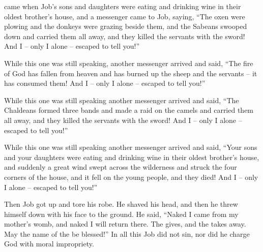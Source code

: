{came when Job’s sons
and daughters
were eating
and drinking
wine
in their oldest
brother’s
house,
and a messenger
came
to
Job,
saying,
“The oxen
were plowing
and the donkeys
were grazing
beside
them,
and the Sabeans
swooped down
and carried
them all away,
and they killed
the servants
with the sword! And I – only I alone – escaped to tell you!”
\par }{\PP {}While
this
one was still speaking,
another
messenger arrived
and said,
“The fire
of God
has fallen
from
heaven
and has burned
up the sheep
and the servants
– it has consumed them! And I – only I alone – escaped to tell you!”
\par }{\PP {}While
this
one was still speaking
another
messenger arrived
and said,
“The Chaldeans
formed three
bands
and made a raid
on
the camels
and carried
them all away,
and they killed
the servants
with the sword! And I – only I alone – escaped to tell you!”
\par }{\PP {}While
this
one was still speaking
another
messenger arrived
and said,
“Your sons
and your daughters
were eating
and drinking
wine
in their oldest
brother’s
house,
and suddenly
a great
wind
swept
across
the wilderness
and struck
the four
corners
of the house,
and it fell
on
the young people,
and they died! And I – only I alone – escaped to tell you!”
\par }{\PP {}Then Job
got
up and tore
his robe.
He shaved
his head,
and then he threw
himself down with his face
to the ground.
He said,
“Naked
I came
from my mother’s
womb,
and naked
I will return
there.
The
{}
gives,
and the
{}
takes away.
May
the name
of the {}
be blessed!”
In all
this
Job
did not
sin,
nor
did he charge
God
with moral impropriety.

}
